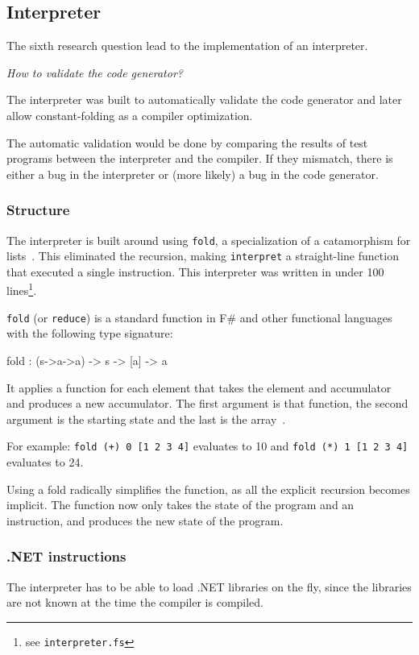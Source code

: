 \subsection{Interpreter}
The sixth research question lead to the implementation of an interpreter.

\textit{How to validate the code generator?}

The interpreter was built to automatically validate the code generator and later allow constant-folding as a compiler optimization.

The automatic validation would be done by comparing the results of test programs between the interpreter and the compiler.
If they mismatch, there is either a bug in the interpreter or (more likely) a bug in the code generator.

\subsubsection{Structure}
The interpreter is built around using \verb|fold|, a specialization of a catamorphism for lists~\cite{gibbons}.
This eliminated the recursion, making \verb|interpret| a straight-line function that executed a single instruction.
This interpreter was written in under 100 lines\footnote{see \texttt{interpreter.fs}}.

\verb|fold| (or \verb|reduce|) is a standard function in F\# and other functional languages with the following type signature:

\begin{FS}
    fold : (s->a->a) -> s -> [a] -> a
\end{FS}

It applies a function for each element that takes the element and accumulator and produces a new accumulator.
The first argument is that function, the second argument is the starting state and the last is the array~\cite{realworldhaskell}.

For example: \texttt{fold (+) 0 [1 2 3 4]} evaluates to 10 and \texttt{fold (*) 1 [1 2 3 4]} evaluates to 24.

Using a fold radically simplifies the function, as all the explicit recursion becomes implicit.
The function now only takes the state of the program and an instruction, and produces the new state of the program.

\subsubsection{.NET instructions}
The interpreter has to be able to load .NET libraries on the fly, since the libraries are not known at the time the compiler is compiled.

